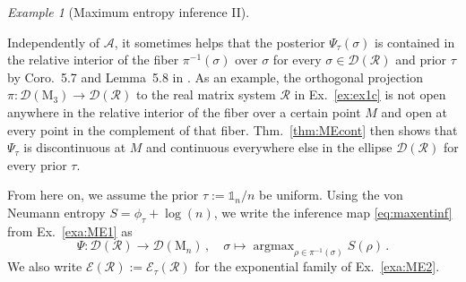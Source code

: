 \documentclass[a4paper,11pt,reqno]{amsart}
\newcommand{\M}{\mathrm{M}}
\newcommand{\cA}{\mathcal{A}}
\newcommand{\cD}{\mathcal{D}}
\newcommand{\cE}{\mathcal{E}}
\newcommand{\cR}{\mathcal{R}}
\newcommand{\id}{\mathds{1}}
\DeclareMathOperator\argmax{argmax}
\theoremstyle{definition}
\theoremstyle{remark}
\newtheorem{exa}[thm]{Example}
\numberwithin{equation}{section}
\begin{document}
\begin{exa}[Maximum entropy inference II]
\begin{enumerate}
Independently of $\cA$, it sometimes helps that the posterior 
$\Psi_\tau(\sigma)$ is contained in the relative interior of the fiber 
$\pi^{-1}(\sigma)$ over $\sigma$ for every $\sigma\in\cD(\cR)$ and prior 
$\tau$ by Coro.~5.7 and Lemma~5.8 in \cite{Weis2014}. As an example, the 
orthogonal projection $\pi:\cD(\M_3)\to\cD(\cR)$ to the real matrix 
system $\cR$ in Ex.~\ref{ex:ex1c} is not open anywhere in the relative 
interior of the fiber over a certain point $M$ and open at every point 
in the complement of that fiber. Thm.~\ref{thm:MEcont} then shows that 
$\Psi_\tau$ is discontinuous at $M$ and continuous everywhere else in 
the ellipse $\cD(\cR)$ for every prior $\tau$.
\end{enumerate}
\end{exa}
%
From here on, we assume the prior $\tau:=\id_n/n$ be uniform. Using the 
von Neumann entropy $S=\phi_\tau+\log(n)$, we write the inference map 
\eqref{eq:maxentinf} from Ex.~\ref{exa:ME1} as 
\[\textstyle
\Psi:\cD(\cR)\to\cD(\M_n)\,,
\quad
\sigma\mapsto\argmax_{\rho\in\pi^{-1}(\sigma)}S(\rho)\,.
\]
We also write $\cE(\cR):=\cE_\tau(\cR)$ for the exponential family of 
Ex.~\ref{exa:ME2}. 
\par
%
\end{document}
